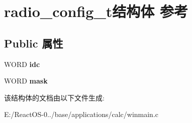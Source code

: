 \hypertarget{structradio__config__t}{}\section{radio\+\_\+config\+\_\+t结构体 参考}
\label{structradio__config__t}
\subsection*{Public 属性}
\begin{DoxyCompactItemize}
\item 
\mbox{\label{structradio__config__t_a17b973d1f0b13127f39d378714c1121b}} 
W\+O\+RD {\bfseries idc}
\item 
\mbox{\label{structradio__config__t_a94c70891a58d2210abad1edb54e04e2c}} 
W\+O\+RD {\bfseries mask}
\end{DoxyCompactItemize}


该结构体的文档由以下文件生成\+:\begin{DoxyCompactItemize}
\item 
E\+:/\+React\+O\+S-\/0../base/applications/calc/winmain.\+c\end{DoxyCompactItemize}
